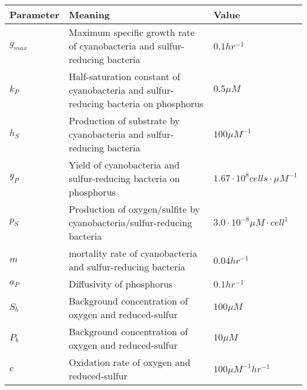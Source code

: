 \documentclass{article}
\begin{document}
    \begin{adjustbox}{angle = 270}
        \centering\renewcommand\arraystretch{1.3}
            \begin{tabular}{lll}
                \toprule
                \large{Parameter} & \large{Meaning} & \large{Value} \\
                \midrule
                $g_{max}$ & Maximum specific growth rate of cyanobacteria and sulfur-reducing bacteria &  $0.1 hr^{-1}$\\
                $k_{P}$ & Half-saturation constant of cyanobacteria and sulfur-reducing bacteria on phosphorus & $0.5 \mu M$ \\
                $h_{S}$ & Production of substrate by cyanobacteria and sulfur-reducing bacteria & $100 \mu M^{-1}$ \\
                $y_{P}$ & Yield of cyanobacteria and sulfur-reducing bacteria on phosphorus & $1.67 \cdot 10^8 cells \cdot \mu M^{-1}$ \\
                $p_{S}$ & Production of oxygen/sulfite by cyanobacteria/sulfur-reducing bacteria & $3.0 \cdot 10^{-8} \mu M \cdot cell^{1}$ \\
                $m$ & mortality rate of cyanobacteria and sulfur-reducing bacteria & $0.04 hr^{-1}$ \\
                $a_{P}$ & Diffusivity of phosphorus & $0.1 hr^{-1}$ \\
                $S_b$ & Background concentration of oxygen and reduced-sulfur & $100 \mu M$\\
                $P_b$ & Background concentration of oxygen and reduced-sulfur & $10 \mu M$\\
                $c$ & Oxidation rate of oxygen and reduced-sulfur & $100 \mu M^{-1}hr^{-1}$ \\
                \bottomrule
            \end{tabular}
    \end{adjustbox}
\end{document}
